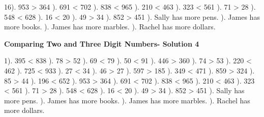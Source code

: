 \documentclass{article}%
\begin{document}
16). 953 > 364%
). 691 < 702%
). 838 < 965%
). 210 < 463%
). 323 < 561%
). 71 > 28%
). 548 < 628%
). 16 < 20%
). 49 > 34%
). 852 > 451%
). Sally has more pens.%
). James has more books.%
). James has more marbles.%
). Rachel has more dollars.%
\newline%
\newpage%
\large%
\begin{center}%
\textbf{Comparing Two and Three Digit Numbers- Solution 4}%
\newline%
\end{center} \normalsize%
1). 395 < 838%
). 78 > 52%
). 69 < 79%
). 50 < 91%
). 446 > 360%
). 74 > 53%
). 220 < 462%
). 725 < 933%
). 27 < 34%
). 46 > 27%
). 597 > 185%
). 349 < 471%
). 859 > 324%
). 85 > 44%
). 196 < 652%
). 953 > 364%
). 691 < 702%
). 838 < 965%
). 210 < 463%
). 323 < 561%
). 71 > 28%
). 548 < 628%
). 16 < 20%
). 49 > 34%
). 852 > 451%
). Sally has more pens.%
). James has more books.%
). James has more marbles.%
). Rachel has more dollars.%
\newline%
\newpage%
\end{document}
